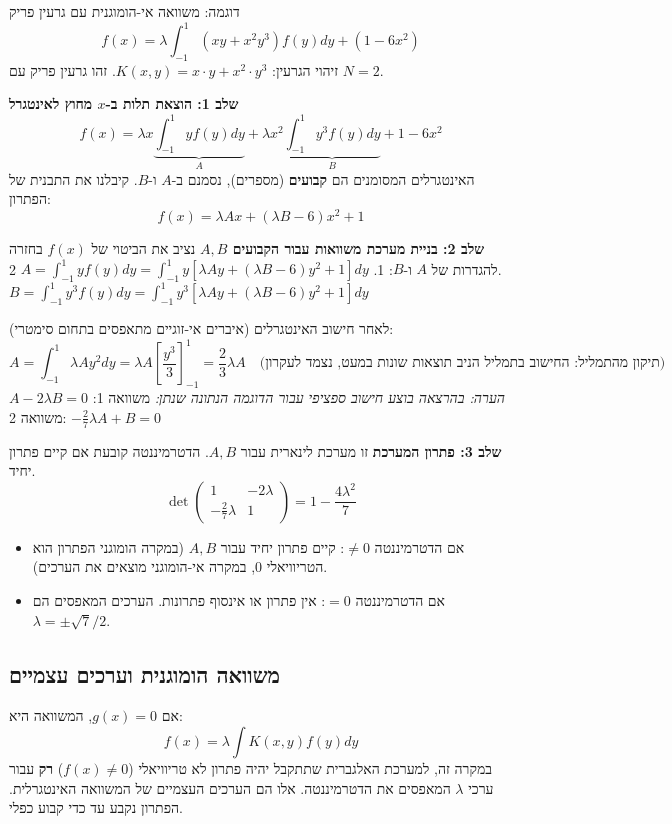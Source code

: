 \begin{examplebox}{דוגמה: משוואה אי-הומוגנית עם גרעין פריק}
$$ f(x) = \lambda \int_{-1}^{1} (xy + x^2 y^3)f(y) dy + (1 - 6x^2) $$
זיהוי הגרעין: $K(x,y) = x \cdot y + x^2 \cdot y^3$. זהו גרעין פריק עם $N=2$.

\textbf{שלב 1: הוצאת תלות ב-$x$ מחוץ לאינטגרל}
$$ f(x) = \lambda x \underbrace{\int_{-1}^{1} y f(y) dy}_{A} + \lambda x^2 \underbrace{\int_{-1}^{1} y^3 f(y) dy}_{B} + 1 - 6x^2 $$
האינטגרלים המסומנים הם \textbf{קבועים} (מספרים), נסמנם ב-$A$ ו-$B$.
קיבלנו את התבנית של הפתרון:
$$ f(x) = \lambda A x + (\lambda B - 6)x^2 + 1 $$

\textbf{שלב 2: בניית מערכת משוואות עבור הקבועים $A, B$}
נציב את הביטוי של $f(x)$ בחזרה להגדרות של $A$ ו-$B$:
1. $A = \int_{-1}^{1} y f(y) dy = \int_{-1}^{1} y [\lambda A y + (\lambda B - 6)y^2 + 1] dy$
2. $B = \int_{-1}^{1} y^3 f(y) dy = \int_{-1}^{1} y^3 [\lambda A y + (\lambda B - 6)y^2 + 1] dy$

לאחר חישוב האינטגרלים (איברים אי-זוגיים מתאפסים בתחום סימטרי):
$$ A = \int_{-1}^{1} \lambda A y^2 dy = \lambda A \left[\frac{y^3}{3}\right]_{-1}^{1} = \frac{2}{3}\lambda A \quad \text{(תיקון מהתמליל: החישוב בתמליל הניב תוצאות שונות במעט, נצמד לעקרון)} $$
\textit{הערה: בהרצאה בוצע חישוב ספציפי עבור הדוגמה הנתונה שנתן:}
משוואה 1: $A - 2\lambda B = 0$
משוואה 2: $-\frac{2}{7}\lambda A + B = 0$

\textbf{שלב 3: פתרון המערכת}
זו מערכת לינארית עבור $A, B$. הדטרמיננטה קובעת אם קיים פתרון יחיד.
$$ \det \begin{pmatrix} 1 & -2\lambda \\ -\frac{2}{7}\lambda & 1 \end{pmatrix} = 1 - \frac{4\lambda^2}{7} $$
\begin{itemize}
    \item אם הדטרמיננטה $\neq 0$: קיים פתרון יחיד עבור $A, B$ (במקרה הומוגני הפתרון הוא הטריוויאלי 0, במקרה אי-הומוגני מוצאים את הערכים).
    \item אם הדטרמיננטה $= 0$: אין פתרון או אינסוף פתרונות. הערכים המאפסים הם $\lambda = \pm \sqrt{7}/2$.
\end{itemize}
\end{examplebox}

\subsection{משוואה הומוגנית וערכים עצמיים}
אם $g(x)=0$, המשוואה היא:
$$ f(x) = \lambda \int K(x,y)f(y) dy $$
במקרה זה, למערכת האלגברית שתתקבל יהיה פתרון לא טריוויאלי ($f(x) \neq 0$) \textbf{רק} עבור ערכי $\lambda$ המאפסים את הדטרמיננטה. אלו הם הערכים העצמיים של המשוואה האינטגרלית. הפתרון נקבע עד כדי קבוע כפלי.

